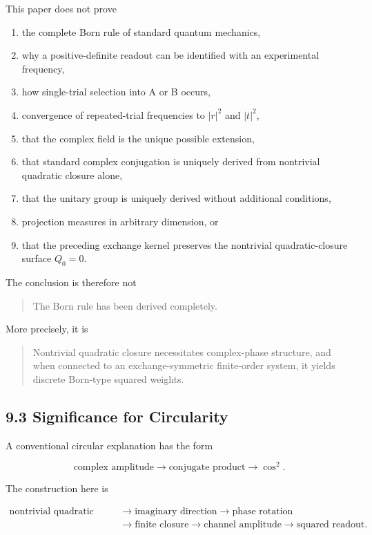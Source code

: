 \documentclass[
  a4paper,
  10pt]{article}
\providecommand{\tightlist}{%
  \setlength{\itemsep}{0pt}\setlength{\parskip}{0pt}}
\begin{document}
This paper does not prove

\begin{enumerate}
\def\labelenumi{\arabic{enumi}.}
\tightlist
\item
  the complete Born rule of standard quantum mechanics,
\item
  why a positive-definite readout can be identified with an experimental
  frequency,
\item
  how single-trial selection into A or B occurs,
\item
  convergence of repeated-trial frequencies to \(|r|^2\) and \(|t|^2\),
\item
  that the complex field is the unique possible extension,
\item
  that standard complex conjugation is uniquely derived from nontrivial
  quadratic closure alone,
\item
  that the unitary group is uniquely derived without additional
  conditions,
\item
  projection measures in arbitrary dimension, or
\item
  that the preceding exchange kernel preserves the nontrivial
  quadratic-closure surface \(Q_0=0\).
\end{enumerate}

The conclusion is therefore not

\begin{quote}
The Born rule has been derived completely.
\end{quote}

More precisely, it is

\begin{quote}
Nontrivial quadratic closure necessitates complex-phase structure, and
when connected to an exchange-symmetric finite-order system, it yields
discrete Born-type squared weights.
\end{quote}

\subsection{9.3 Significance for
Circularity}\label{93-significance-for-circularity}

A conventional circular explanation has the form

\[
\text{complex amplitude}
\rightarrow
\text{conjugate product}
\rightarrow
\cos^2.
\]

The construction here is

\[
\begin{aligned}
\text{nontrivial quadratic closure}
&\rightarrow\text{imaginary direction}
\rightarrow\text{phase rotation}\\
&\rightarrow\text{finite closure}
\rightarrow\text{channel amplitude}
\rightarrow\text{squared readout}.
\end{aligned}
\]
\end{document}

